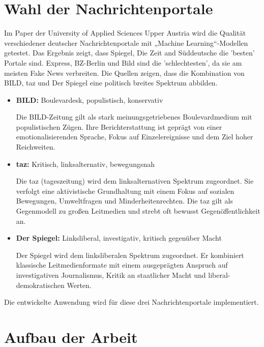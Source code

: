 \section{Wahl der Nachrichtenportale}
\label{sec:wahl_nachrichtenportale}

Im Paper der University of Applied Sciences Upper Austria \cite{Simone2022} wird die Qualität verschiedener deutscher Nachrichtenportale mit 
„Machine Learning“-Modellen getestet. 
Das Ergebnis zeigt, dass Spiegel, Die Zeit and Süddeutsche die 'besten' Portale sind. Express, BZ-Berlin und Bild sind die 'schlechtesten', da sie
am meisten Fake News verbreiten.
Die Quellen \cite{henke2024nachrichten, Lieb2023, Osing2022} zeigen, dass die Kombination von BILD, taz und Der Spiegel eine politisch 
breites Spektrum abbilden.

\begin{itemize}
    \item \textbf{BILD:} Boulevardesk, populistisch, konservativ
   
    Die BILD-Zeitung gilt als stark meinungsgetriebenes Boulevardmedium mit populistischen Zügen. Ihre Berichterstattung ist geprägt von einer emotionalisierenden Sprache, 
    Fokus auf Einzelereignisse und dem Ziel hoher Reichweiten.

    \item \textbf{taz:} Kritisch, linksalternativ, bewegungsnah
    
    Die taz (tageszeitung) wird dem linksalternativen Spektrum zugeordnet. Sie verfolgt eine aktivistische Grundhaltung mit einem Fokus auf 
    sozialen Bewegungen, Umweltfragen und Minderheitenrechten. 
    Die taz gilt als Gegenmodell zu großen Leitmedien und strebt oft bewusst Gegenöffentlichkeit an.

    \item \textbf{Der Spiegel:} Linksliberal, investigativ, kritisch gegenüber Macht
    
    Der Spiegel wird dem linksliberalen Spektrum zugeordnet. Er kombiniert klassische Leitmedienformate mit einem ausgeprägten Anspruch auf 
    investigativen Journalismus, Kritik an staatlicher Macht und liberal-demokratischen Werten.
\end{itemize}

Die entwickelte Anwendung wird für diese drei Nachrichtenportale implementiert.

\section{Aufbau der Arbeit}
\label{sec:aufbau}

